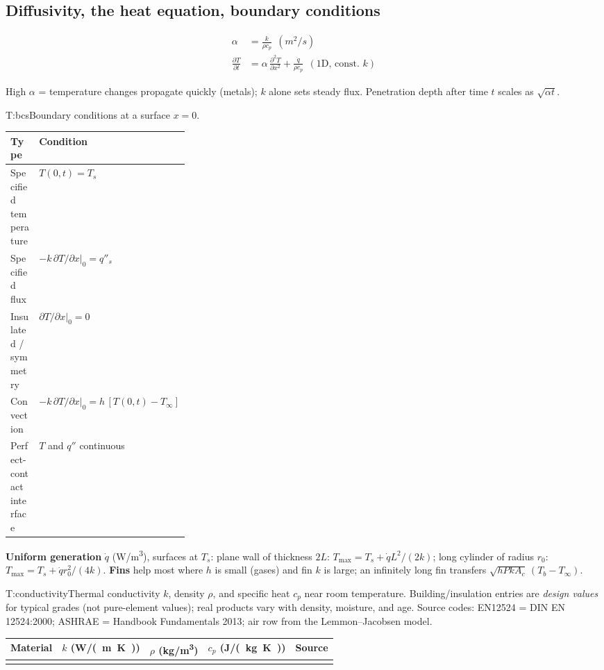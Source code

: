 \begin{multicols}{2}
\subsection{Diffusivity, the heat equation, boundary conditions}\label{sec:heateq}
\begin{formulabox}
\vspace{-6pt}
\begin{align}
\alpha &= \frac{k}{\rho c_p}\ \ (\si{m^2/s}) \label{F:transfer:diffusivity}\\
\frac{\partial T}{\partial t} &= \alpha\,\frac{\partial^2T}{\partial x^2}+\frac{\dot q}{\rho c_p}\ \ (\text{1D, const.\ } k) \label{F:transfer:heateq}
\end{align}
\end{formulabox}
High $\alpha$ = temperature changes propagate quickly (metals); $k$ alone sets steady flux. Penetration depth after time $t$ scales as $\sqrt{\alpha t}$.

\begin{reftab}{T:bcs}{Boundary conditions at a surface $x=0$.}
\small
\begin{tabularx}{\linewidth}{@{}L{0.30\linewidth}Y@{}}
\toprule
Type & Condition\\
\midrule
Specified temperature & $T(0,t)=T_s$\\
Specified flux & $-k\,\partial T/\partial x|_0=q''_s$\\
Insulated / symmetry & $\partial T/\partial x|_0=0$\\
Convection & $-k\,\partial T/\partial x|_0=h\,[T(0,t)-T_\infty]$\\
Perfect-contact interface & $T$ and $q''$ continuous\\
\bottomrule
\end{tabularx}\end{reftab}

\EXT{} \textbf{Uniform generation} $\dot q$ (\si{W/m^3}), surfaces at $T_s$: plane wall of thickness $2L$: $T_{\max}=T_s+\dot qL^2/(2k)$; long cylinder of radius $r_0$: $T_{\max}=T_s+\dot q r_0^2/(4k)$. \textbf{Fins} help most where $h$ is small (gases) and fin $k$ is large; an infinitely long fin transfers $\sqrt{hPkA_c}\,(T_b-T_\infty)$.
\end{multicols}

\begin{reftab}{T:conductivity}{Thermal conductivity $k$, density $\rho$, and specific heat $c_p$ near room temperature. Building/insulation entries are \emph{design values} for typical grades (not pure-element values); real products vary with density, moisture, and age. Source codes: EN12524 = DIN EN 12524:2000; ASHRAE = Handbook Fundamentals 2013; air row from the Lemmon--Jacobsen model.}
\small
\begin{tabularx}{\textwidth}{@{}Yrrrl@{}}
\toprule
Material & $k$ (\si{W/(m.K)}) & $\rho$ (\si{kg/m^3}) & $c_p$ (\si{J/(kg.K)}) & Source\\
\midrule
{}
\bottomrule
\end{tabularx}\end{reftab}
